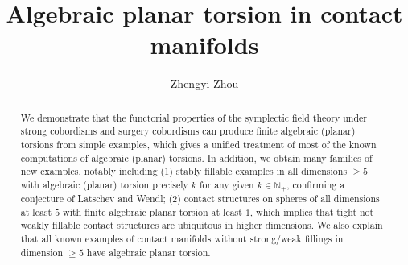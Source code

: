 \documentclass[11pt]{amsart}
\title{Algebraic planar torsion in contact manifolds}
\author{Zhengyi Zhou}
\numberwithin{equation}{section}
\def\N{{\mathbb N}}
\begin{document}
	\maketitle
\begin{abstract}
We demonstrate that the functorial properties of the symplectic field theory under strong cobordisms and surgery cobordisms can produce finite algebraic (planar) torsions from simple examples, which gives a unified treatment of most of the known computations of algebraic (planar) torsions. In addition, we obtain many families of new examples, notably including (1) stably fillable examples in all dimensions $\ge 5$ with algebraic (planar) torsion precisely $k$ for any given $k\in \N_+$, confirming a conjecture of Latschev and  Wendl; (2) contact structures on spheres of all dimensions at least $5$ with finite algebraic planar torsion at least $1$, which implies that tight not weakly fillable contact structures are ubiquitous in higher dimensions. We also explain that all known examples of contact manifolds without strong/weak fillings in dimension $\ge 5$ have algebraic planar torsion.
\end{abstract}
\end{document}
